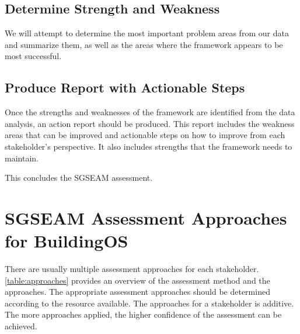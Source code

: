 \documentclass[11pt,oneside]{book}
\begin{document}
\section{Determine Strength and Weakness}

We will attempt to determine the most important problem areas from our
data and summarize them, as well as the areas where the framework
appears to be most successful.

\section{Produce Report with Actionable Steps}

Once the strengths and weaknesses of the framework are identified from
the data analysis, an action report should be produced.  This report
includes the weakness areas that can be improved and actionable steps
on how to improve from each stakeholder's perspective. It also
includes strengths that the framework needs to maintain.

This concludes the SGSEAM assessment.

\appendix

\chapter{SGSEAM Assessment Approaches for BuildingOS}
\label{app:sgseam-approaches}

There are usually multiple assessment approaches for each stakeholder.  \autoref{table:approaches} provides 
an overview of the assessment method and the approaches. The appropriate assessment approaches should 
be determined according to the resource available. The approaches for a stakeholder is additive. The more 
approaches applied, the higher confidence of the assessment can be achieved. 
\end{document}
